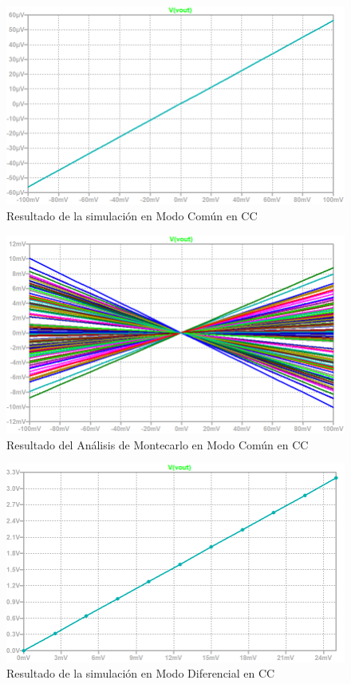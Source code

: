 \begin{figure}[!ht]
\begin{center}
\includegraphics[width=0.9\linewidth]{../Ex4/Informe/res/spice/spice_cm_dc.png}
\caption{Resultado de la simulación en Modo Común en CC}
\label{e4:fig_spice_cm_dc_res}
\end{center}
\end{figure}

\begin{figure}[!ht]
\begin{center}
\includegraphics[width=0.85\linewidth]{../Ex4/Informe/res/spice/spice_cm_dc_mc.png}
\caption{Resultado del Análisis de Montecarlo en Modo Común en CC}
\label{e4:fig_spice_cm_dc_mc}
\end{center}
\end{figure}

\begin{figure}[!ht]
\begin{center}
\includegraphics[width=0.85\linewidth]{../Ex4/Informe/res/spice/spice_dm_dc.png}
\caption{Resultado de la simulación en Modo Diferencial en CC}
\label{e4:fig_spice_dm_dc_res}
\end{center}
\end{figure}

